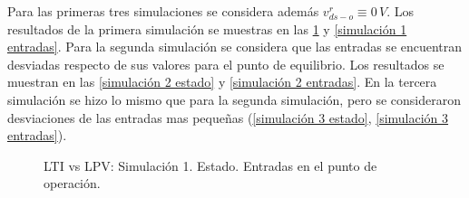 \documentclass[a4paper, 10pt, onecolumn,journal]{ieeeconf}
\begin{document}
Para las primeras tres simulaciones se considera además  $v^r_{ds-o}\equiv 0 \,V$.
Los resultados de la primera simulación se muestras en las \cref{simulación 1 estado} y \cref{simulación 1 entradas}.
Para la segunda simulación se considera que las entradas se encuentran desviadas respecto de sus valores para el punto de equilibrio. Los resultados se muestran
en las \cref{simulación 2 estado} y \cref{simulación 2 entradas}. En la tercera simulación se hizo lo mismo que para la segunda simulación, pero se consideraron desviaciones de las entradas mas
pequeñas (\cref{simulación 3 estado}, \cref{simulación 3 entradas}).

\begin{figure}[thpb]
	\centering
	\begin{adjustbox}{max width=\columnwidth}
	\end{adjustbox}
	\caption{LTI vs LPV: Simulación 1. Estado. Entradas en el punto de operación.}
	\label{simulación 1 estado}
\end{figure}
\end{document}
